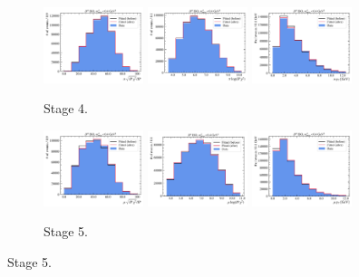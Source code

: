 \begin{figure}[htb]
    \begin{subfigure}{\textwidth}
        \centering
        \includegraphics[width=0.32\textwidth]{./figs-mc-correction/reweighting-final/plot_step3-D0_iso-pi_comp.pdf}
        \includegraphics[width=0.32\textwidth]{./figs-mc-correction/reweighting-final/plot_step3-D0_iso-pi_log_ip_chi2.pdf}
        \includegraphics[width=0.32\textwidth]{./figs-mc-correction/reweighting-final/plot_step3-D0_iso-pi_pt.pdf}
        \caption{Stage 4.}
    \end{subfigure}

    \begin{subfigure}{\textwidth}
        \centering
        \includegraphics[width=0.32\textwidth]{./figs-mc-correction/reweighting-final/plot_step4-D0_iso-mu_comp.pdf}
        \includegraphics[width=0.32\textwidth]{./figs-mc-correction/reweighting-final/plot_step4-D0_iso-mu_log_ip_chi2.pdf}
        \includegraphics[width=0.32\textwidth]{./figs-mc-correction/reweighting-final/plot_step4-D0_iso-mu_pt.pdf}
        \caption{Stage 5.}
    \end{subfigure}


\end{figure}
